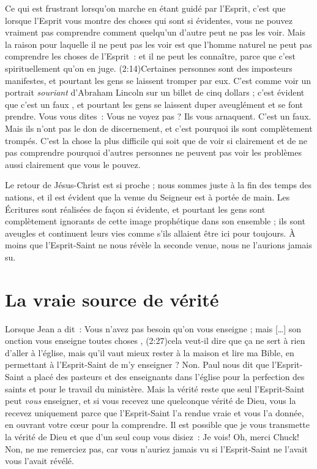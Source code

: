 Ce qui est frustrant lorsqu'on marche en étant guidé par l'Esprit,
 c'est que lorsque l'Esprit vous montre des choses qui sont si évidentes,
 vous ne pouvez vraiment pas comprendre comment quelqu'un d'autre
 peut ne pas les voir. Mais la raison pour laquelle il ne peut pas les voir
 est que l'homme naturel ne peut pas comprendre les choses de l'Esprit~:
 \Og [\dots{}] et il ne peut les connaître, parce que c'est spirituellement
 qu'on en juge. \Fg{}
 (2:14)Certaines personnes sont des imposteurs manifestes,
 et pourtant les gens se laissent tromper par eux.
 C'est comme voir un portrait \emph{souriant} d'Abraham Lincoln
 sur un billet de cinq dollars ; c'est évident que c'est un faux
 ,
 et pourtant les gens se laissent duper aveuglément et se font prendre.
 Vous vous dites~: \Og Vous ne voyez pas ? Ils vous arnaquent.
 C'est un faux. \Fg{}
 Mais ils n'ont pas le don de discernement, et c'est pourquoi ils sont
 complètement trompés.
 C'est la chose la plus difficile qui soit que de voir si clairement
 et de ne pas comprendre pourquoi d'autres personnes ne peuvent
 pas voir les problèmes aussi clairement que vous le pouvez.

Le retour de Jésus-Christ est si proche ; nous sommes juste à la fin
 des temps des nations, et il est évident que la venue du Seigneur
 est à portée de main. Les Écritures sont réalisées de façon si évidente,
 et pourtant les gens sont complètement ignorants de cette image prophétique
 dans son ensemble ; ils sont aveugles et continuent leurs vies
 comme s'ils allaient être ici pour toujours.
 À moins que l'Esprit-Saint ne nous révèle la seconde venue,
 nous ne l'aurions jamais su.


\section{La vraie source de v\'erit\'e}

Lorsque Jean a dit~:
 \Og Vous n'avez pas besoin qu'on vous enseigne ;
 mais [\dots{}] son onction vous enseigne toutes choses \Fg{},
 (2:27)cela veut-il dire que ça ne sert à rien
 d'aller à l'église,
 mais qu'il vaut mieux rester à la maison et lire ma Bible,
 en permettant à l'Esprit-Saint de m'y enseigner ? Non.
 Paul nous dit que l'Esprit-Saint a placé des pasteurs
 et des enseignants dans l'église pour la perfection des saints
 et pour le travail du ministère.
 Mais la vérité reste que seul l'Esprit-Saint peut \emph{vous} enseigner,
 et si vous recevez une quelconque vérité de Dieu,
 vous la recevez uniquement parce que l'Esprit-Saint
 l'a rendue vraie et vous l'a donnée, en ouvrant votre cœur
 pour la comprendre.
 Il est possible que je vous transmette la vérité de Dieu
 et que d'un seul coup vous disiez~: \Og Je vois!
 Oh, merci Chuck! \Fg{} Non, ne me remerciez pas,
 car vous n'auriez jamais vu si l'Esprit-Saint
 ne l'avait vous l'avait révélé.
 \nowidow[4]



